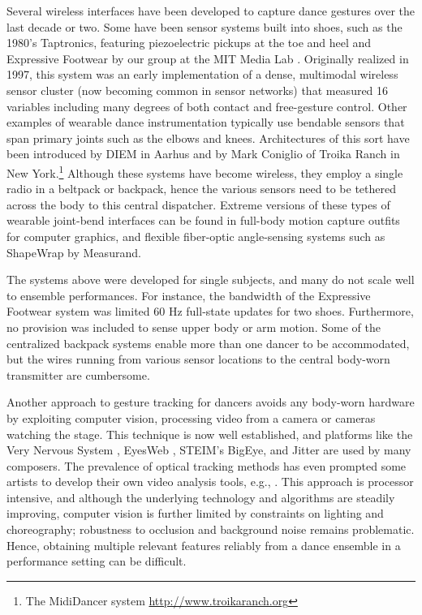 Several wireless interfaces have been developed to capture dance gestures over the last decade or two.  Some have been sensor systems built into shoes, such as the 1980's Taptronics, featuring piezoelectric pickups at the toe and heel \cite{Perma:1988} and Expressive Footwear by our group at the MIT Media Lab \cite{Paradiso:2000}. Originally realized in 1997, this system was an early implementation of a dense, multimodal wireless sensor cluster (now becoming common in sensor networks) that measured 16 variables including many degrees of both contact and free-gesture control. Other examples of wearable dance instrumentation typically use bendable sensors that span primary joints such as the elbows and knees. Architectures of this sort have been introduced by DIEM in Aarhus \cite{Siegel:1998} and by Mark Coniglio of Troika Ranch in New York.\footnote{The {MidiDancer} system \url{http://www.troikaranch.org}} Although these systems have become wireless, they employ a single radio in a beltpack or backpack, hence the various sensors need to be tethered across the body to this central dispatcher. Extreme versions of these types of wearable joint-bend interfaces can be found in full-body motion capture outfits for computer graphics, and flexible fiber-optic angle-sensing systems such as ShapeWrap by Measurand.


The systems above were developed for single subjects, and many do not scale well to ensemble performances. For instance, the bandwidth of the Expressive Footwear system was limited 60 Hz full-state updates for two shoes. Furthermore, no provision was included to sense upper body or arm motion. Some of the centralized backpack systems enable more than one dancer to be accommodated, but the wires running from various sensor locations to the central body-worn transmitter are cumbersome.

Another approach to gesture tracking for dancers avoids any body-worn hardware by exploiting computer vision, processing video from a camera or cameras watching the stage. This technique is now well established, and platforms like the Very Nervous System \cite{Zacks:1990}, EyesWeb \cite{Camurri:2000b}, STEIM's BigEye, and Jitter are used by many composers. The prevalence of optical tracking methods has even prompted some artists to develop their own video analysis tools, e.g., \cite{Downie:2005,Wechsler:2004}. This approach is processor intensive, and although the underlying technology and algorithms are steadily improving, computer vision is further limited by constraints on lighting and choreography; robustness to occlusion and background noise remains problematic. Hence, obtaining multiple relevant features reliably from a dance ensemble in a performance setting can be difficult.

